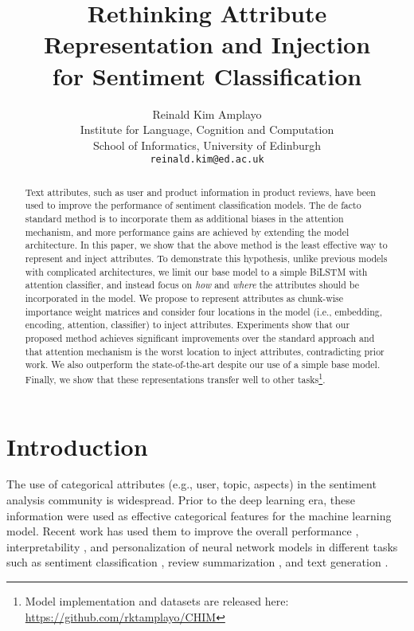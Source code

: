 \documentclass[11pt,a4paper]{article}
\title{Rethinking Attribute Representation and Injection\\ for Sentiment Classification}
\author{Reinald Kim Amplayo \\
  Institute for Language, Cognition and Computation \\
  School of Informatics, University of Edinburgh \\
  {\tt reinald.kim@ed.ac.uk} \\
}
\date{}
\begin{document}
\maketitle
\begin{abstract}
  Text attributes, such as user and product information in product reviews, have been used to improve the performance of sentiment classification models. The de facto standard method is to incorporate them as additional biases in the attention mechanism, and more performance gains are achieved by extending the model architecture. In this paper, we show that the above method is the least effective way to represent and inject attributes. To demonstrate this hypothesis, unlike previous models with complicated architectures, we limit our base model to a simple BiLSTM with attention classifier, and instead focus on \textit{how} and \textit{where} the attributes should be incorporated in the model. We propose to represent attributes as chunk-wise importance weight matrices and consider four locations in the model (i.e., embedding, encoding, attention, classifier) to inject attributes. Experiments show that our proposed method achieves significant improvements over the standard approach and that attention mechanism is the worst location to inject attributes, contradicting prior work. We also outperform the state-of-the-art despite our use of a simple base model. Finally, we show that these representations transfer well to other tasks\footnote{ Model implementation and datasets are released here: \url{https://github.com/rktamplayo/CHIM}}.
\end{abstract}

\section{Introduction}

The use of categorical attributes (e.g., user, topic, aspects) in the sentiment analysis community \cite{kim2004determining,pang2007opinion,liu2012sentiment} is widespread.
Prior to the deep learning era, these information were used as effective categorical features \cite{li2011incorporating,tan2011user,gao2013modeling,park2015retrieval} for the machine learning model. Recent work has used them to improve the overall performance \cite{chen2016neural,dong2017learning}, interpretability \cite{amplayo2018cold,angelidis2018summarizing}, and personalization \cite{ficler2017controlling} of neural network models in different tasks such as sentiment classification \cite{tang2015learning}, review summarization \cite{yang2018cross}, and text generation \cite{dong2017learning}.
\end{document}
